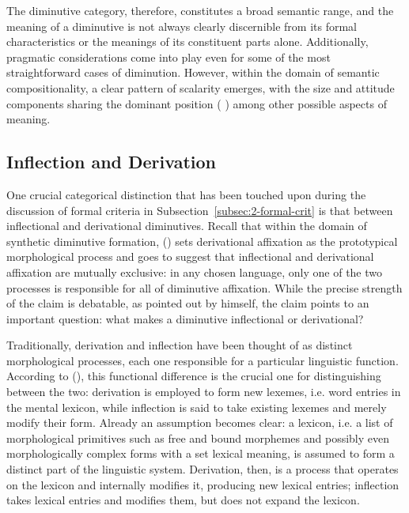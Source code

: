 The diminutive category, therefore, constitutes a broad semantic range, and the meaning of a diminutive is not always clearly discernible from its formal characteristics or the meanings of its constituent parts alone. Additionally, pragmatic considerations come into play even for some of the most straightforward cases of diminution. However, within the domain of semantic compositionality, a clear pattern of scalarity emerges, with the size and attitude components sharing the dominant position (\citeauthor{Schneider+2003} \citeyear{Schneider+2003}) among other possible aspects of meaning.

\subsection{Inflection and Derivation}
\label{subsec:2-infl-deriv}
One crucial categorical distinction that has been touched upon during the discussion of formal criteria in Subsection~\ref{subsec:2-formal-crit} is that between inflectional and derivational diminutives. Recall that within the domain of synthetic diminutive formation, \citeauthor{Schneider+2003} (\citeyear{Schneider+2003}) sets derivational affixation as the prototypical morphological process and goes to suggest that inflectional and derivational affixation are mutually exclusive: in any chosen language, only one of the two processes is responsible for all of diminutive affixation. While the precise strength of the claim is debatable, as pointed out by \citeauthor{Schneider+2003} himself, the claim points to an important question: what makes a diminutive inflectional or derivational?

Traditionally, derivation and inflection have been thought of as distinct morphological processes, each one responsible for a particular linguistic function. According to \citeauthor{Booij+2000} (\citeyear{Booij+2000}), this functional difference is the crucial one for distinguishing between the two: derivation is employed to form new lexemes, i.e. word entries in the mental lexicon, while inflection is said to take existing lexemes and merely modify their form. Already an assumption becomes clear: a lexicon, i.e. a list of morphological primitives such as free and bound morphemes and possibly even morphologically complex forms with a set lexical meaning, is assumed to form a distinct part of the linguistic system. Derivation, then, is a process that operates on the lexicon and internally modifies it, producing new lexical entries; inflection takes lexical entries and modifies them, but does not expand the lexicon.


